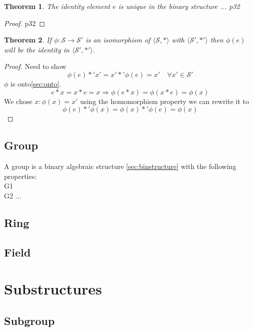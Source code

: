 \documentclass[a4paper,11pt]{kth-mag}
\newtheorem{theorem}{Theorem}
\renewcommand{\SS}{\ensuremath{\mathcal{S}}}
\begin{document}
\begin{theorem}
The identity element $e$ is unique in the binary structure
... p32
\end{theorem}
\begin{proof}
    p32    
\end{proof}
\begin{theorem}
    If $\phi:\SS\rightarrow\SS'$ is an isomorphism of $\langle\SS,*\rangle$
    with $\langle\SS',*'\rangle$ then %
    $\phi(e)$ will be the identity in $\langle\SS',*'\rangle$.
\end{theorem}
\begin{proof}
Need to show   
\begin{equation}
    \phi(e)*'x'=x'*'\phi(e)=x' \quad \forall x'\in\SS'
\end{equation}
$\phi$ is onto\eqref{sec:onto}.
\begin{equation}
    e*x=x*e=x \Rightarrow \phi(e*x)=\phi(x*e)=\phi(x) 
\end{equation}
We chose $x:\phi(x)=x'$ using the homomorphism property we can rewrite it to
\begin{equation}
    \phi(e)*'\phi(x)=\phi(x)*'\phi(e)=\phi(x) 
\end{equation}
\end{proof}


\subsection{Group}
\label{sec:group}
A group is a binary algebraic structure \eqref{sec:binstructure} with the
following properties:\\
G1\\
G2
...

\subsection{Ring}
\label{sec:ring}
\subsection{Field}
\label{sec:field}

\section{Substructures}
\subsection{Subgroup}
\end{document}
